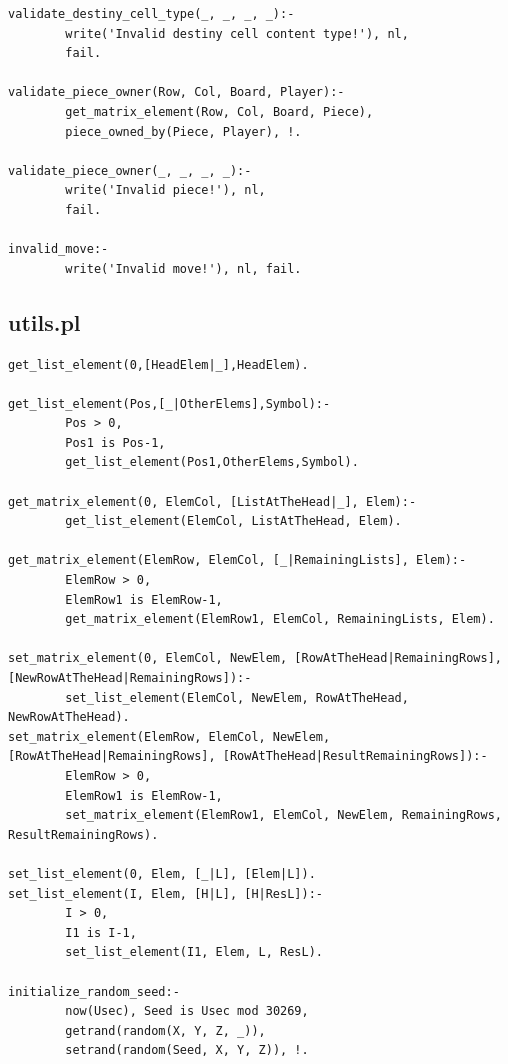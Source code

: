 \documentclass[a4paper]{article}
\begin{document}
\begin{lstlisting}[style=customprologwithlines]
validate_destiny_cell_type(_, _, _, _):-
        write('Invalid destiny cell content type!'), nl,
        fail.

validate_piece_owner(Row, Col, Board, Player):-
        get_matrix_element(Row, Col, Board, Piece),
        piece_owned_by(Piece, Player), !.

validate_piece_owner(_, _, _, _):-
        write('Invalid piece!'), nl,
        fail.

invalid_move:-
        write('Invalid move!'), nl, fail.
\end{lstlisting}

\subsection{utils.pl}
\begin{lstlisting}[style=customprologwithlines]
get_list_element(0,[HeadElem|_],HeadElem).

get_list_element(Pos,[_|OtherElems],Symbol):-
        Pos > 0,
        Pos1 is Pos-1,
        get_list_element(Pos1,OtherElems,Symbol).

get_matrix_element(0, ElemCol, [ListAtTheHead|_], Elem):-
        get_list_element(ElemCol, ListAtTheHead, Elem).

get_matrix_element(ElemRow, ElemCol, [_|RemainingLists], Elem):-
        ElemRow > 0,
        ElemRow1 is ElemRow-1,
        get_matrix_element(ElemRow1, ElemCol, RemainingLists, Elem).

set_matrix_element(0, ElemCol, NewElem, [RowAtTheHead|RemainingRows], [NewRowAtTheHead|RemainingRows]):-
        set_list_element(ElemCol, NewElem, RowAtTheHead, NewRowAtTheHead).
set_matrix_element(ElemRow, ElemCol, NewElem, [RowAtTheHead|RemainingRows], [RowAtTheHead|ResultRemainingRows]):-
        ElemRow > 0,
        ElemRow1 is ElemRow-1,
        set_matrix_element(ElemRow1, ElemCol, NewElem, RemainingRows, ResultRemainingRows).

set_list_element(0, Elem, [_|L], [Elem|L]).
set_list_element(I, Elem, [H|L], [H|ResL]):-
        I > 0,
        I1 is I-1,
        set_list_element(I1, Elem, L, ResL).

initialize_random_seed:-
        now(Usec), Seed is Usec mod 30269,
        getrand(random(X, Y, Z, _)),
        setrand(random(Seed, X, Y, Z)), !.
\end{lstlisting}
\end{document}

